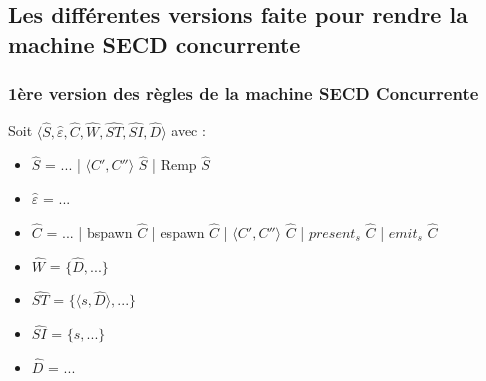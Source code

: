 \documentclass[10pt,a4paper]{article}
\begin{document}
			\subsection{Les différentes versions faite pour rendre la machine SECD concurrente}
				\subsubsection{1ère version des règles de la machine SECD Concurrente}\label{SECDConc1}
					Soit $\langle\widehat{S},\widehat{\varepsilon},\widehat{C},\widehat{W},\widehat{ST},\widehat{SI},\widehat{D}\rangle$ avec :
					
					\begin{itemize}
						\item[] $\widehat{S}$ = ... | $\langle C',C''\rangle$ $\widehat{S}$ | Remp $\widehat{S}$
						\item[] $\widehat{\varepsilon}$ = ... 
						\item[] $\widehat{C}$ = ... | bspawn $\widehat{C}$ | espawn $\widehat{C}$ | $\langle C',C''\rangle$ $\widehat{C}$ | $present_{s}$ $\widehat{C}$ | $emit_{s}$ $\widehat{C}$ 
						\item[] $\widehat{W}$ = $\{\widehat{D},...\}$
						\item[] $\widehat{ST}$ = $\{\langle s,\widehat{D}\rangle,...\}$
						\item[] $\widehat{SI}$ = $\{ s,...\}$
						\item[] $\widehat{D}$ = ...
					\end{itemize}
					\bigbreak
					
\end{document}

